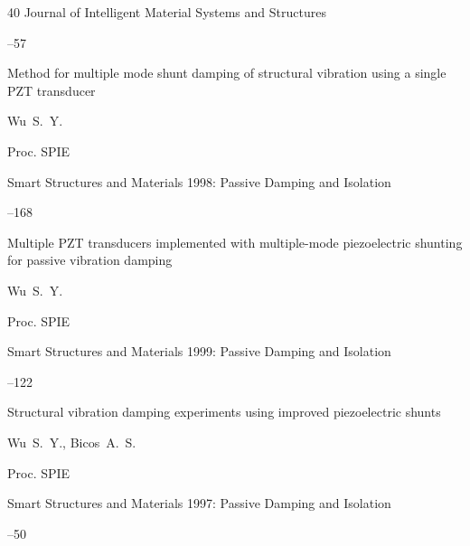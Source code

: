 \begin{thebibliography}{40}
\jour  Journal of Intelligent Material Systems and Structures




--57





\paper Method for multiple mode shunt damping of structural vibration using a single PZT transducer

\by Wu~S.~Y.

\jour Proc. SPIE  


\volinfo Smart Structures and Materials 1998: Passive Damping and Isolation


--168





\paper Multiple PZT transducers implemented with multiple-mode piezoelectric shunting for passive vibration damping

\by Wu~S.~Y.

\jour Proc. SPIE  


\volinfo Smart Structures and Materials 1999: Passive Damping and Isolation


--122





\paper Structural vibration damping experiments using improved piezoelectric shunts

\by Wu~S.~Y., Bicos~A.~S.

\jour Proc. SPIE 


\volinfo Smart Structures and Materials 1997: Passive Damping and Isolation


--50






\end{thebibliography}
